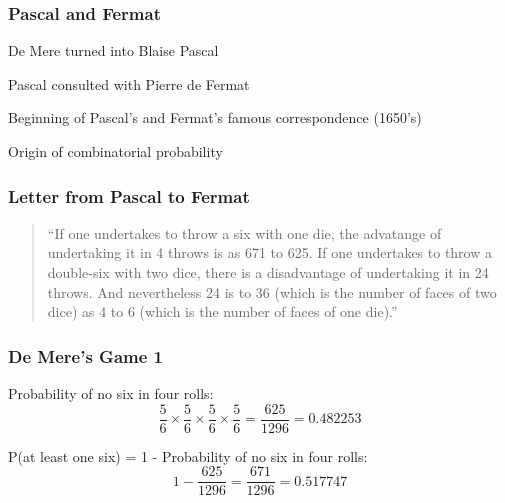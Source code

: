 \documentclass[12pt]{beamer}\usepackage[]{graphicx}\usepackage[]{color}
\begin{document}

\begin{frame}
\frametitle{Pascal and Fermat}

\bbi
  \item De Mere turned into Blaise Pascal
  \item Pascal consulted with Pierre de Fermat
  \item Beginning of Pascal's and Fermat's famous correspondence (1650's)
  \item Origin of combinatorial probability
\ei

\end{frame}


\begin{frame}[fragile]
\frametitle{}
\begin{center}
\end{center}
\end{frame}


\begin{frame}
\frametitle{Letter from Pascal to Fermat}

\begin{quotation}
``If one undertakes to throw a six with one die, the advatange of undertaking it in 4 throws is as 671 to 625. If one undertakes to throw a double-six with two dice, there is a disadvantage of undertaking it in 24 throws. And nevertheless 24 is to 36 (which is the number of faces of two dice) as 4 to 6 (which is the number of faces of one die).''
\end{quotation}

\end{frame}


\begin{frame}[fragile]
\frametitle{De Mere's Game 1}

Probability of no six in four rolls:
$$
\frac{5}{6} \times \frac{5}{6} \times \frac{5}{6} \times \frac{5}{6} = \frac{625}{1296} = 0.482253
$$

\bigskip
\pause
P(at least one six) = 1 - Probability of no six in four rolls:
$$
1 - \frac{625}{1296} = \frac{671}{1296} = 0.517747
$$

\end{frame}
\end{document}
